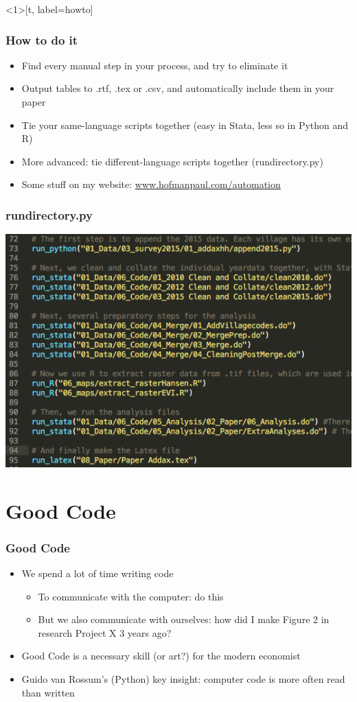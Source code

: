 \documentclass{beamer}
\newcommand{\link}[2]{{\color{blue}\setulcolor{blue}\ul{#2}}} %
\begin{document}
\begin{frame}<1>[t, label=howto]\frametitle{How to do it}
	\begin{itemize}
		\item<1-> Find every manual step in your process, and try to eliminate it
		\item<1-> Output tables to .rtf, .tex or .csv, and automatically include them in your paper
		\item<1-> Tie your same-language scripts together (easy in Stata, less so in Python and R)
		\item<1-> More advanced: tie different-language scripts together (rundirectory.py)
		\item<2-> Some stuff on my website: \link{}{www.hofmanpaul.com/automation}
	\end{itemize}
\end{frame}

\begin{frame}[t]\frametitle{rundirectory.py}
	\centering\includegraphics[height=0.8\textheight]{rundirectory_example.png}
\end{frame}


\section{Good Code}

\begin{frame}[t]\frametitle{Good Code}
	\begin{itemize}
		\item We spend a lot of time writing code
		\begin{itemize}
			\item To communicate with the computer: do this
			\item But we also communicate with ourselves: how did I make Figure 2 in research Project X 3 years ago?
		\end{itemize}
		\item Good Code is a necessary skill (or art?) for the modern economist
		\item Guido van Rossum's (Python) key insight: computer code is more often read than written
	\end{itemize}
\end{frame}
\end{document}
